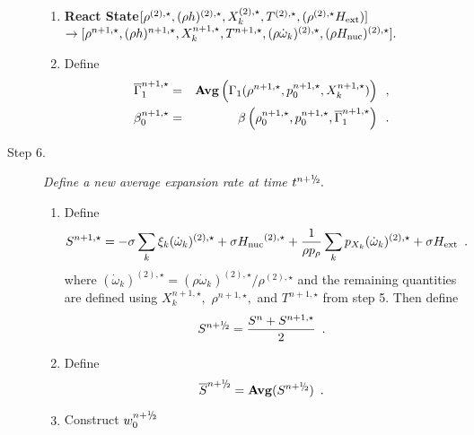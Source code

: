 \documentclass[11pt]{article}
\newcommand{\gammabar}{\overline{\Gamma}_1}
\newcommand{\sfrac}[2]{\mathchoice
  {\kern0em\raise.5ex\hbox{\the\scriptfont0 #1}\kern-.15em/
   \kern-.15em\lower.25ex\hbox{\the\scriptfont0 #2}}
  {\kern0em\raise.5ex\hbox{\the\scriptfont0 #1}\kern-.15em/
   \kern-.15em\lower.25ex\hbox{\the\scriptfont0 #2}}
  {\kern0em\raise.5ex\hbox{\the\scriptscriptfont0 #1}\kern-.2em/
   \kern-.15em\lower.25ex\hbox{\the\scriptscriptfont0 #2}}
  {#1\!/#2}}
\newcommand{\myhalf}{\sfrac{1}{2}}
\newcommand{\nph}{{n + \myhalf}}
\newcommand{\Hext}{{H_{\rm ext}}}
\newcommand{\Hnuc}{{H_{\rm nuc}}}
\newcommand{\omegadot}{\dot{\omega}}
\begin{document}
\begin{description}
\begin{enumerate}
\item {\bf React State}$[ \rho^{(2),\star},(\rho h)^{(2),\star}, X_k^{(2),\star}, 
                             T^{(2),\star}, (\rho^{(2),\star} \Hext)] $\\
$\rightarrow [ \rho^{n+1,\star},(\rho h)^{n+1,\star}, X_k^{n+1,\star}, T^{n+1,\star}, 
              (\rho \omegadot_k)^{(2),\star}, (\rho \Hnuc)^{(2),\star} ].$  

\item Define
\begin{eqnarray}
 \gammabar^{n+1,\star}    &=& {\rm{\bf Avg}} \left( \Gamma_1(\rho^{n+1,\star}, p_0^{n+1,\star}, 
                                                      X_k^{n+1,\star}) \right) \enskip , \\
 {\beta   }_0^{n+1,\star}    &=& \beta   \left(\rho_0^{n+1,\star}, p_0^{n+1,\star}, \gammabar^{n+1,\star}\right) \enskip .
\end{eqnarray}

\end{enumerate}

\item[Step 6.] {\em Define a new average expansion rate at time $t^\nph.$}

\begin{enumerate}
\renewcommand{\theenumi}{{\bf \alph{enumi}}}
\item Define
\begin{equation}
  S^{n+1,\star} =  -\sigma  \sum_k  \xi_k  (\omegadot_k)^{(2),\star}  + 
  \sigma \Hnuc^{(2),\star} +
  \frac{1}{\rho p_\rho} \sum_k p_{X_k}  ({\omegadot}_k)^{(2),\star}  
  + \sigma \Hext \enskip .
\end{equation} 
where $(\omegadot_k)^{(2),\star} = (\rho \omegadot_k)^{(2),\star} / \rho^{(2),\star}$
and the remaining quantities are defined using $X_k^{n+1,\star},$ $\rho^{n+1,\star},$ 
and $T^{n+1,\star}$ from step 5.
Then define
\begin{equation}
 S^\nph = \frac{S^n + S^{n+1,\star}}{2} \enskip. 
\end{equation}

\item Define
\begin{equation}
\overline{S}^{\nph} = {\mathrm{\bf Avg}} (S^{\nph}) \enskip.
\end{equation}

\item Construct $w_0^{\nph}$


\end{enumerate}
\end{description}
\end{document}
